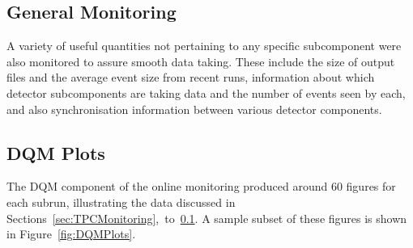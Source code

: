 \subsection{General Monitoring}\label{sec:GeneralMonitoring}

A variety of useful quantities not pertaining to any specific subcomponent were also monitored to assure smooth data taking.  These include the size of output files and the average event size from recent runs, information about which detector subcomponents are taking data and the number of events seen by each, and also synchronisation information between various detector components.

\subsection{DQM Plots}\label{sec:DQMPlots}

The DQM component of the online monitoring produced around 60 figures for each subrun, illustrating the data discussed in Sections~\ref{sec:TPCMonitoring},~to~\ref{sec:GeneralMonitoring}.  A sample subset of these figures is shown in Figure~\ref{fig:DQMPlots}.

